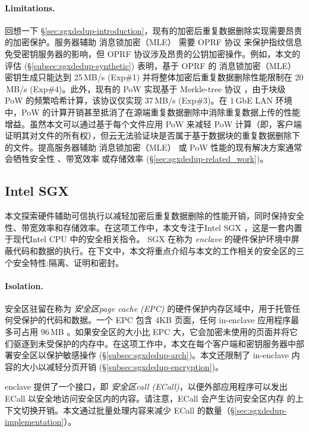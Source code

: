 \paragraph*{Limitations.} 回想一下 \S\ref{sec:sgxdedup-introduction}，现有的加密后重复数据删除实现需要昂贵的加密保护。服务器辅助 消息锁加密（MLE） 需要 OPRF 协议 \cite{naor2004Number} 来保护指纹信息免受密钥服务器的影响，但 OPRF 协议涉及昂贵的公钥加密操作。例如，本文的评估 (\S\ref{subsec:sgxdedup-synthetic}) 表明，基于 OPRF 的 消息锁加密（MLE） 密钥生成只能达到 25\,MB/s (Exp\#1) 并将整体加密后重复数据删除性能限制在 20 \,MB/s (Exp\#4)。此外，现有的 PoW 实现基于 Merkle-tree 协议 \cite{halevi11}，由于块级 PoW 的频繁哈希计算，该协议仅实现 37\,MB/s (Exp\#3)。在 1\,GbE LAN 环境中，PoW 的计算开销甚至抵消了在源端重复数据删除中消除重复数据上传的性能增益。虽然本文可以通过基于每个文件应用 PoW 来减轻 PoW 计算（即，客户端证明其对文件的所有权），但云无法验证块是否属于基于数据块的重复数据删除下的文件。提高服务器辅助 消息锁加密（MLE） 或 PoW 性能的现有解决方案通常会牺牲安全性 \cite{li2020TED,xu2013weak,pietro12}、带宽效率 \cite{harnik2010side,li15} 或存储效率 \cite{zhou2015secdep,qin17,li2020TED} (\S\ref{sec:sgxdedup-related_work})。

\subsection{Intel SGX}
\label{subsec:sgxdedup-sgx} 

本文探索硬件辅助可信执行以减轻加密后重复数据删除的性能开销，同时保持安全性、带宽效率和存储效率。在这项工作中，本文专注于Intel SGX \cite{sgx}，这是一套内置于现代Intel CPU 中的安全相关指令。 SGX 在称为 \textit{ enclave} 的硬件保护环境中屏蔽代码和数据的执行。在下文中，本文将重点介绍与本文的工作相关的安全区的三个安全特性:隔离、证明和密封。

\paragraph*{Isolation.}安全区驻留在称为 \textit{安全区page cache (EPC)} 的硬件保护内存区域中，用于托管任何受保护的代码和数据。一个 EPC 包含 4KB 页面，任何 in-enclave 应用程序最多可占用 96\,MB \cite{harnik18}。如果安全区的大小比 EPC 大，它会加密未使用的页面并将它们驱逐到未受保护的内存中。在这项工作中，本文在每个客户端和密钥服务器中部署安全区以保护敏感操作 (\S\ref{subsec:sgxdedup-arch})。本文还限制了 in-enclave 内容的大小以减轻分页开销 (\S\ref{subsec:sgxdedup-encryption})。

enclave 提供了一个接口，即 \textit{安全区call (ECall)}，以便外部应用程序可以发出 ECall 以安全地访问安全区内的内容。请注意，ECall 会产生访问安全区内存 \cite{harnik18} 的上下文切换开销。本文通过批量处理内容来减少 ECall 的数量（\S\ref{sec:sgxdedup-implementation}）。

